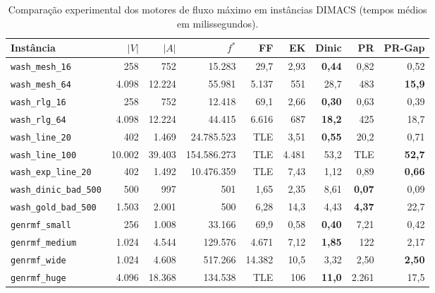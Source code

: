 \begin{table}[!ht]
\centering
\small
\setlength{\tabcolsep}{3.5pt}
\begin{tabular}{lrrrrrrrr}
\toprule
\textbf{Instância} & $|V|$ & $|A|$ & $f^*$ & \textbf{FF} & \textbf{EK} & \textbf{Dinic} & \textbf{PR} & \textbf{PR-Gap} \\
\midrule
\texttt{wash\_mesh\_16} & 258 & 752 & 15.283 & 29,7 & 2,93 & \textbf{0,44} & 0,82 & 0,52 \\
\texttt{wash\_mesh\_64} & 4.098 & 12.224 & 55.981 & 5.137 & 551 & 28,7 & 483 & \textbf{15,9} \\
\texttt{wash\_rlg\_16} & 258 & 752 & 12.418 & 69,1 & 2,66 & \textbf{0,30} & 0,63 & 0,39 \\
\texttt{wash\_rlg\_64} & 4.098 & 12.224 & 44.415 & 6.616 & 687 & \textbf{18,2} & 425 & 18,7 \\
\texttt{wash\_line\_20} & 402 & 1.469 & 24.785.523 & TLE & 3,51 & \textbf{0,55} & 20,2 & 0,71 \\
\texttt{wash\_line\_100} & 10.002 & 39.403 & 154.586.273 & TLE & 4.481 & 53,2 & TLE & \textbf{52,7} \\
\texttt{wash\_exp\_line\_20} & 402 & 1.492 & 10.476.359 & TLE & 7,43 & 1,12 & 0,89 & \textbf{0,66} \\
\texttt{wash\_dinic\_bad\_500} & 500 & 997 & 501 & 1,65 & 2,35 & 8,61 & \textbf{0,07} & 0,09 \\
\texttt{wash\_gold\_bad\_500} & 1.503 & 2.001 & 500 & 6,28 & 14,3 & 4,43 & \textbf{4,37} & 22,7 \\
\texttt{genrmf\_small} & 256 & 1.008 & 33.166 & 69,9 & 0,58 & \textbf{0,40} & 7,21 & 0,42 \\
\texttt{genrmf\_medium} & 1.024 & 4.544 & 129.576 & 4.671 & 7,12 & \textbf{1,85} & 122 & 2,17 \\
\texttt{genrmf\_wide} & 1.024 & 4.608 & 517.266 & 14.382 & 10,5 & 3,32 & 2,50 & \textbf{2,50} \\
\texttt{genrmf\_huge} & 4.096 & 18.368 & 134.538 & TLE & 106 & \textbf{11,0} & 2.261 & 17,5 \\
\bottomrule
\end{tabular}
\caption{Comparação experimental dos motores de fluxo máximo em instâncias DIMACS (tempos médios em milissegundos).}
\label{tab:benchmarks_maxflow}
\end{table}
